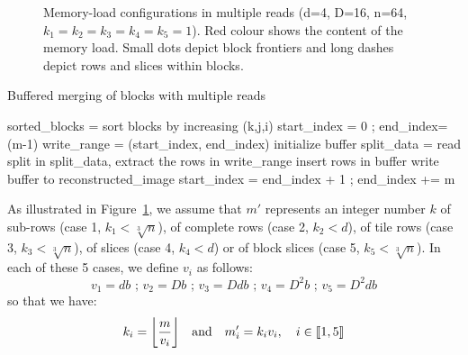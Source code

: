 \documentclass[10pt, conference, compsocconf]{IEEEtran}
\DeclarePairedDelimiter{\floor}{\lfloor}{\rfloor}
\begin{document}
\begin{figure}
\centering
\def\svgwidth{0.3\columnwidth}

\def\svgwidth{0.3\columnwidth}

\def\svgwidth{0.3\columnwidth}


\medskip

\def\svgwidth{0.3\columnwidth}

\def\svgwidth{0.3\columnwidth}

\caption{Memory-load configurations in multiple reads (d=4, D=16,
  n=64, $k_1=k_2=k_3=k_4=k_5=1$). Red colour shows the content of the
  memory load. Small dots depict block frontiers and long dashes
  depict rows and slices within blocks.}
\label{fig:multiple-reads-cases}
\end{figure}



\begin{algorithm}[h]
  \caption{Buffered merging of blocks with multiple reads}
  \label{algo:multiple-reads}
  \begin{algorithmic}[1]
  \STATE sorted\_blocks = sort blocks by increasing (k,j,i)
  \STATE start\_index = 0 ; end\_index=(m-1)
  \STATE write\_range = (start\_index, end\_index)
    \STATE initialize buffer
        \STATE split\_data = read split
        \STATE in split\_data, extract the rows in write\_range
        \STATE insert rows in buffer
      \ENDIF
    \ENDFOR
    \STATE write buffer to reconstructed\_image
    \STATE start\_index = end\_index + 1 ; end\_index += m
  \ENDWHILE

  \end{algorithmic}
\end{algorithm}

As illustrated in Figure~\ref{fig:multiple-reads-cases}, we assume
that $m'$ represents an integer number $k$ of sub-rows (case 1,
$k_1<\sqrt[3]{n}$), of complete rows (case 2, $k_2<d$), of tile rows
(case 3, $k_3<\sqrt[3]{n}$), of slices (case 4, $k_4<d$) or of block
slices (case 5, $k_5<\sqrt[3]{n}$). In each of these 5 cases, we
define $v_i$ as follows:
\begin{equation*}
  v_1=db \text{ ; }  v_2=Db \text{ ; } v_3=Ddb \text{ ; } v_4=D^2b \text{ ; } v_5=D^2db
\end{equation*}
so that we have:
\begin{equation*}
k_i=\floor*{\frac{m}{v_i}} \quad \mathrm{and} \quad m_i'=k_iv_i, \quad i \in \llbracket 1,5 \rrbracket
\end{equation*}
\end{document}
